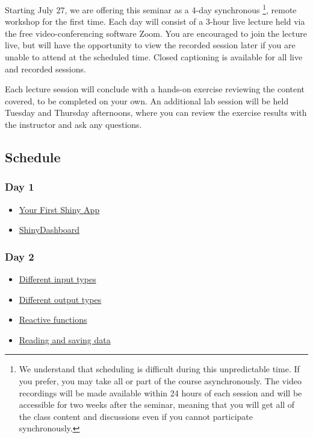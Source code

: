 \documentclass[
  oneside]{book}
\providecommand{\tightlist}{%
  \setlength{\itemsep}{0pt}\setlength{\parskip}{0pt}}
\begin{document}
Starting July 27, we are offering this seminar as a 4-day synchronous \footnote{We understand that scheduling is difficult during this unpredictable time. If you prefer, you may take all or part of the course asynchronously. The video recordings will be made available within 24 hours of each session and will be accessible for two weeks after the seminar, meaning that you will get all of the class content and discussions even if you cannot participate synchronously.}, remote workshop for the first time. Each day will consist of a 3-hour live lecture held via the free video-conferencing software Zoom. You are encouraged to join the lecture live, but will have the opportunity to view the recorded session later if you are unable to attend at the scheduled time. Closed captioning is available for all live and recorded sessions.

Each lecture session will conclude with a hands-on exercise reviewing the content covered, to be completed on your own. An additional lab session will be held Tuesday and Thursday afternoons, where you can review the exercise results with the instructor and ask any questions.

\hypertarget{schedule}{%
\subsection{Schedule}\label{schedule}}

\hypertarget{day-1}{%
\subsubsection*{Day 1}\label{day-1}}

\begin{itemize}
\tightlist
\item
  \protect\hyperlink{first-app}{Your First Shiny App}
\item
  \protect\hyperlink{shinydashboard}{ShinyDashboard}
\end{itemize}

\hypertarget{day-2}{%
\subsubsection*{Day 2}\label{day-2}}

\begin{itemize}
\tightlist
\item
  \protect\hyperlink{inputs}{Different input types}
\item
  \protect\hyperlink{outputs}{Different output types}
\item
  \protect\hyperlink{reactives}{Reactive functions}
\item
  \protect\hyperlink{data}{Reading and saving data}
\end{itemize}
\end{document}
